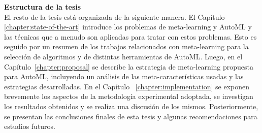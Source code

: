 \textbf{\Large Estructura de la tesis}\\

El resto de la tesis está organizada de la siguiente manera. El Capítulo~
\ref{chapter:state-of-the-art} introduce los problemas de meta-learning y
AutoML y las técnicas que a menudo son aplicadas para tratar con estos
problemas. Esto es seguido por un resumen de los trabajos relacionados con
meta-learning para la selección de algoritmos y de distintas herramientas de
AutoML. Luego, en el Capítulo~\ref{chapter:proposal} se describe la estrategia
de meta-learning propuesta para AutoML, incluyendo un análisis de las
meta-características usadas y las estrategias desarrolladas. En el Capítulo~
\ref{chapter:implementation} se exponen brevemente los aspectos de la
metodología experimental adoptada, se investigan los resultados obtenidos y se
realiza una discusión de los mismos. Posteriormente, se presentan las
conclusiones finales de esta tesis y algunas recomendaciones para estudios
futuros.
